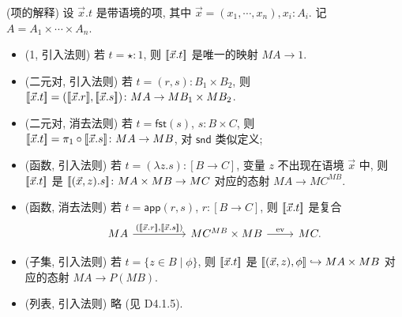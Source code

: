\begin{definition}
	[label={higher-order-term-interpretation}]
	{(项的解释)}
	设 $\vec x.t$ 是带语境的项, 其中 $\vec x=(x_1,\cdots,x_n), x_i\colon A_i$. 记 $A=A_1\times\cdots\times A_n$.
	\begin{itemize}
		\item (1, 引入法则) 若 $t=\star\colon 1$, 则 ${[\![\vec x.t]\!]}$ 是唯一的映射 $MA \to 1$.
		\item (二元对, 引入法则) 若 $t= (r,s)\colon B_1\times B_2$, 则 ${[\![\vec x.t]\!]} = ({[\![\vec x.r]\!]}, {[\![\vec x.s]\!]})\colon MA \to MB_1\times MB_2$.
		\item (二元对, 消去法则) 若 $t=\mathsf {fst}(s)$, $s\colon B\times C$, 则 ${[\![\vec x.t]\!]} = \pi_1\circ {[\![\vec x.s]\!]}\colon MA\to MB$, 对 $\mathsf {snd}$ 类似定义;
		\item (函数, 引入法则) 若 $t=(\lambda z.s)\colon [B\to C]$, 变量 $z$ 不出现在语境 $\vec x$ 中, 则 ${[\![\vec x.t]\!]}$ 是 ${[\![(\vec x,z).s]\!]}\colon MA\times MB\to MC$ 对应的态射 $MA \to MC^{MB}$.
		\item (函数, 消去法则) 若 $t = \mathsf {app}(r,s)$, $r\colon [B\to C]$, 则
		${[\![\vec x.t]\!]}$ 是复合 %
		\[\begin{tikzcd}[ampersand replacement=\&]
			MA \&\& {MC^{MB}\times MB} \& MC.
			\arrow["{(\interpretation{\vec x.r}, \interpretation{\vec x. s})}", from=1-1, to=1-3]
			\arrow["{\text{ev}}", from=1-3, to=1-4]
		\end{tikzcd}\]
		\item (子集, 引入法则) 若 $t=\{z\in B\mid \phi\}$, 则 ${[\![\vec x.t]\!]}$ 是 ${[\![(\vec x,z),\phi]\!]}\hookrightarrow MA\times MB$ 对应的态射 $MA \to P(MB)$.
		\item (列表, 引入法则) 略 (见 \cite{Elephant} D4.1.5).
	\end{itemize}
\end{definition}
